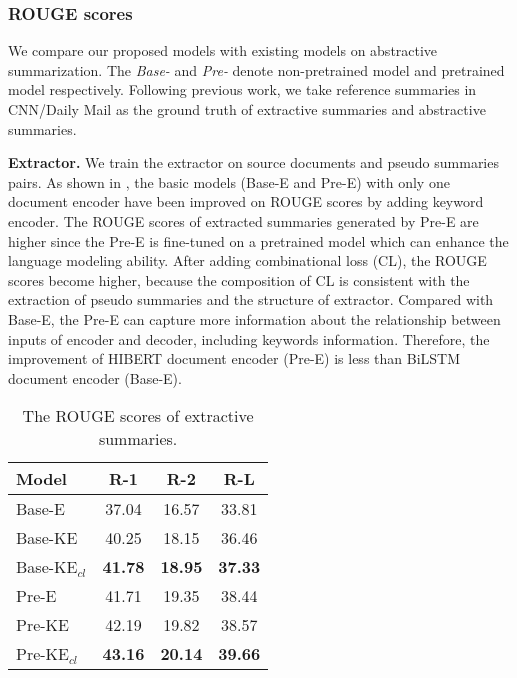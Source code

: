 \subsubsection{ROUGE scores}
We compare our proposed models with existing models on abstractive summarization.
The {\em Base-} and {\em Pre-} denote non-pretrained model
and pretrained model respectively.
Following previous work, we take reference summaries in CNN/Daily Mail as
the ground truth of extractive summaries and abstractive summaries. 

\textbf{Extractor.}
We train the extractor on source documents and pseudo summaries pairs.
As shown in ,
the basic models (Base-E and Pre-E) with only one document encoder 
have been improved on ROUGE scores by adding keyword encoder.
The ROUGE scores of extracted summaries generated by Pre-E
are higher
since the Pre-E is fine-tuned on a pretrained model which
can enhance the language modeling ability.
After adding combinational loss (CL), the ROUGE scores
become higher,
because the composition of CL is consistent with 
the extraction of pseudo summaries
and the structure of extractor.
Compared with Base-E, the Pre-E can capture
more information about the relationship between inputs of encoder and decoder,
including keywords information.
Therefore, the improvement of 
HIBERT document encoder (Pre-E)
is less than 
BiLSTM document encoder (Base-E).

\begin{table}[th!]
\scriptsize
\begin{center}
		\begin{tabular}{|l|c|c|c|}
		\hline
		Model &   R-1 & R-2 & R-L \\
		\hline
		Base-E &  37.04 & 16.57 & 33.81 \\
		Base-KE &  40.25 & 18.15 & 36.46 \\
		Base-KE$_{cl}$ & \bf 41.78 & \bf 18.95 & \bf 37.33 \\
		\hline
		Pre-E & 41.71 & 19.35 & 38.44 \\
		Pre-KE &  42.19 & 19.82 & 38.57 \\
		Pre-KE$_{cl}$ & \bf 43.16 & \bf 20.14 & \bf 39.66 \\
		\hline
		\end{tabular}
\caption{The ROUGE scores of extractive summaries.
}
\label{tab:enc}
\end{center}
\end{table}

